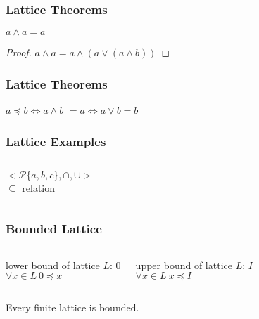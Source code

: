 \documentclass[dvipsnames]{beamer}
\begin{document}
\begin{frame}
  \frametitle{Lattice Theorems}

  \begin{theorem}
    $a \wedge a = a$
  \end{theorem}

  \pause
  \begin{proof}
    $a \wedge a = a \wedge (a \vee (a \wedge b))$
  \end{proof}
\end{frame}

\begin{frame}
  \frametitle{Lattice Theorems}

  \begin{theorem}
    $a \preceq b \Leftrightarrow a \wedge b$
    $ = a \Leftrightarrow a \vee b = b$
  \end{theorem}
\end{frame}

\begin{frame}
  \frametitle{Lattice Examples}

  \begin{example}
    \begin{columns}
      \[
	<\mathcal{P}\{a,b,c\},\cap,\cup>
      \]
      $\subseteq$ relation

      \begin{center}
      \end{center}
    \end{columns}
  \end{example}
\end{frame}

\begin{frame}
  \frametitle{Bounded Lattice}

  \begin{columns}[t]
    \begin{definition}
      lower bound of lattice $L$: $0$\\
      $\forall x \in L~0 \preceq x$
    \end{definition}

    \pause
    \begin{definition}
      upper bound of lattice $L$: $I$\\
      $\forall x \in L~x \preceq I$
    \end{definition}
  \end{columns}

  \pause
  \bigskip
  \begin{theorem}
    Every finite lattice is bounded.
  \end{theorem}
\end{frame}
\end{document}
